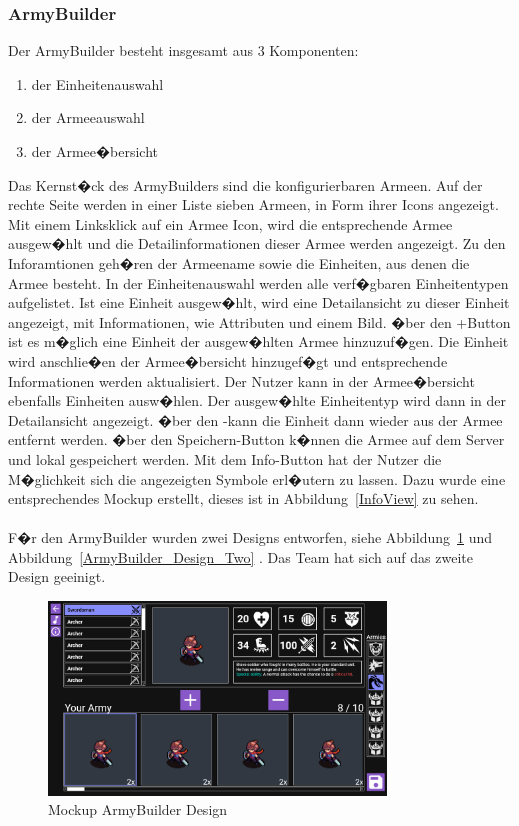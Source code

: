\documentclass[12pt, titlepage]{scrartcl}
\newcommand{\RN}[1]{%
	\textup{\uppercase\expandafter{\romannumeral#1}}%
}
\newcommand{\Abb}[1]{%
	Abbildung\ \ref{#1}%
}
\begin{document}
		\subsubsection{ArmyBuilder}
			Der ArmyBuilder besteht insgesamt aus 3 Komponenten:
			\begin{enumerate}
				\item der Einheitenauswahl
				\item der Armeeauswahl
				\item der Armee�bersicht
			\end{enumerate}
		Das Kernst�ck des ArmyBuilders sind die konfigurierbaren Armeen. Auf der rechte Seite werden in einer Liste sieben Armeen, in Form ihrer Icons angezeigt. Mit einem Linksklick auf ein Armee Icon, wird die entsprechende Armee ausgew�hlt und die Detailinformationen dieser Armee werden angezeigt. Zu den Inforamtionen geh�ren der Armeename sowie die Einheiten, aus denen die Armee besteht. In der Einheitenauswahl werden alle verf�gbaren Einheitentypen aufgelistet. Ist eine Einheit ausgew�hlt, wird eine Detailansicht zu dieser Einheit angezeigt, mit Informationen, wie Attributen und einem Bild. �ber den \glqq +\grqq Button ist es m�glich eine Einheit der ausgew�hlten Armee hinzuzuf�gen. Die Einheit wird anschlie�en der Armee�bersicht hinzugef�gt und entsprechende Informationen werden aktualisiert. Der Nutzer kann in der Armee�bersicht ebenfalls Einheiten ausw�hlen. Der ausgew�hlte Einheitentyp wird dann in der Detailansicht angezeigt. �ber den \glqq -\grqq kann die Einheit dann wieder aus der Armee entfernt werden. �ber den \glqq Speichern\grqq-Button k�nnen die Armee auf dem Server und lokal gespeichert werden. Mit dem \glqq Info\grqq-Button hat der Nutzer die M�glichkeit sich die angezeigten Symbole erl�utern zu lassen. Dazu wurde eine entsprechendes Mockup erstellt, dieses ist in \Abb{InfoView} zu sehen.\\ \\ F�r den ArmyBuilder wurden zwei Designs entworfen, siehe \Abb{ArmyBuilder_Design_One} und \Abb{ArmyBuilder_Design_Two}. Das Team hat sich auf das zweite Design geeinigt. 
		\begin{figure}[H] 
			\centering
			\includegraphics[width=0.8\textwidth]{ArmyBuilder_Design_One.png}
			\caption{Mockup ArmyBuilder Design \RN{1} }
			\label{ArmyBuilder_Design_One}
		\end{figure}
\end{document}
